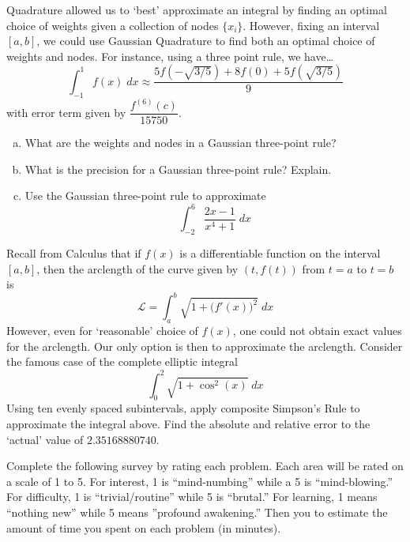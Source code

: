 \documentclass[11pt,letterpaper]{article}
\begin{document}
\newpage



 Quadrature allowed us to `best' approximate an integral by finding an optimal choice of weights given a collection of nodes $\{ x_i \}$. However, fixing an interval $[a, b]$, we could use Gaussian Quadrature to find both an optimal choice of weights and nodes. For instance, using a three point rule, we have\dots
	\[
	\int_{-1}^1 f(x) \;dx \approx \dfrac{5f(-\sqrt{3/5}) + 8f(0) + 5f(\sqrt{3/5})}{9}
	\]
with error term given by $\dfrac{f^{(6)}(c)}{15750}$. 

\begin{enumerate}[(a)]
\item What are the weights and nodes in a Gaussian three-point rule?
\item What is the precision for a Gaussian three-point rule? Explain. 
\item Use the Gaussian three-point rule to approximate
	\[
	\int_{-2}^6 \dfrac{2x - 1}{x^4 + 1} \;dx
	\]
\end{enumerate}



\newpage



 Recall from Calculus that if $f(x)$ is a differentiable function on the interval $[a, b]$, then the arclength of the curve given by $(t, f(t))$ from $t= a$ to $t= b$ is
	\[
	\mathcal{L}= \int_a^b \sqrt{1 + \big(f'(x)\big)^2} \;dx
	\]
However, even for `reasonable' choice of $f(x)$, one could not obtain exact values for the arclength. Our only option is then to approximate the arclength. Consider the famous case of the complete elliptic integral
	\[
	\int_0^2 \sqrt{1 + \cos^2(x)} \;dx
	\]
Using ten evenly spaced subintervals, apply composite Simpson's Rule to approximate the integral above. Find the absolute and relative error to the `actual' value of $2.35168880740$. 



\newpage



 \pvspace{0.3cm}

Complete the following survey by rating each problem. Each area will be rated on a scale of 1 to 5. For interest, 1 is ``mind-numbing'' while a 5 is ``mind-blowing.'' For difficulty, 1 is ``trivial/routine'' while 5 is ``brutal.'' For learning, 1 means ``nothing new'' while 5 means ''profound awakening.'' Then you to estimate the amount of time you spent on each problem (in minutes). 
\end{document}
